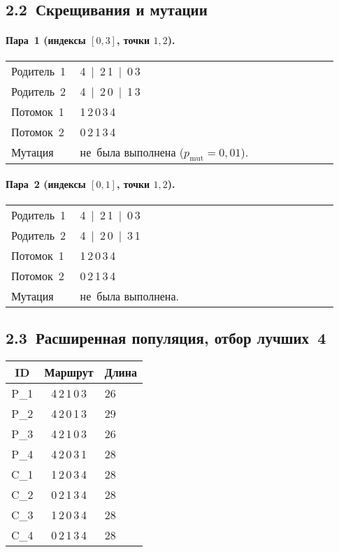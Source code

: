 \documentclass[a4paper,12pt]{article}
\begin{document}
\subsection*{2.2 Скрещивания и мутации}

\paragraph{Пара 1 (индексы $[0,3]$, точки $1,2$).}
\begin{longtable}{@{}p{0.18\linewidth}p{0.75\linewidth}@{}}
Родитель 1 & 4 \,|\, 2\,1 \,|\, 0\,3\\
Родитель 2 & 4 \,|\, 2\,0 \,|\, 1\,3\\
Потомок 1  & 1\,2\,0\,3\,4\\
Потомок 2  & 0\,2\,1\,3\,4\\
Мутация    & не была выполнена ($p_{\text{mut}}=0{,}01$).\\
\end{longtable}

\paragraph{Пара 2 (индексы $[0,1]$, точки $1,2$).}
\begin{longtable}{@{}p{0.18\linewidth}p{0.75\linewidth}@{}}
Родитель 1 & 4 \,|\, 2\,1 \,|\, 0\,3\\
Родитель 2 & 4 \,|\, 2\,0 \,|\, 3\,1\\
Потомок 1  & 1\,2\,0\,3\,4\\
Потомок 2  & 0\,2\,1\,3\,4\\
Мутация    & не была выполнена.\\
\end{longtable}

\subsection*{2.3 Расширенная популяция, отбор лучших 4}

\begin{center}
\begin{tabular}{>{\ttfamily}ccl}
\toprule
ID & Маршрут & Длина\\\midrule
P\_1 & 4\,2\,1\,0\,3 & 26\\
P\_2 & 4\,2\,0\,1\,3 & 29\\
P\_3 & 4\,2\,1\,0\,3 & 26\\
P\_4 & 4\,2\,0\,3\,1 & 28\\ \midrule
C\_1 & 1\,2\,0\,3\,4 & 28\\
C\_2 & 0\,2\,1\,3\,4 & 28\\
C\_3 & 1\,2\,0\,3\,4 & 28\\
C\_4 & 0\,2\,1\,3\,4 & 28\\
\bottomrule
\end{tabular}
\end{center}
\end{document}
